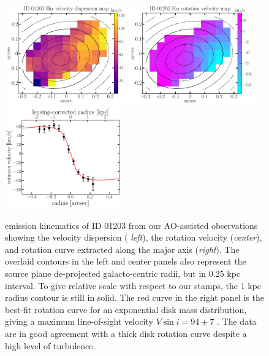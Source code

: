 \begin{figure}
    \centering
    \includegraphics[height=1.7in]{fig/dispersion_ID01203.pdf}
    \includegraphics[height=1.7in]{fig/rotation_ID01203.pdf}
    \includegraphics[height=1.7in]{fig/rotcurve_ID01203.pdf}
    \caption[\Ha emission kinematics of ID 01203 from our \osiris AO-assisted observations.]
    {\Ha emission kinematics of ID 01203 from our \osiris AO-assisted observations showing the velocity 
    dispersion ({\it
    left}), the rotation velocity ({\it center}), and rotation curve extracted along the major axis ({\it right}).
    The overlaid contours in the left and center panels also represent the source plane de-projected galacto-centric radii, but in
    0.25 kpc interval. To give relative scale with respect to our \hst stamps, the 1 kpc radius contour is still in solid.
    The red curve in the right panel is the best-fit rotation curve for an exponential disk mass distribution, giving a maximum
    line-of-sight velocity $V\sin i = 94 \pm 7$ \kms.
    The data are in good agreement with a thick disk rotation curve despite a high level of turbulence.
    \label{fig:kinem}}
\end{figure}


